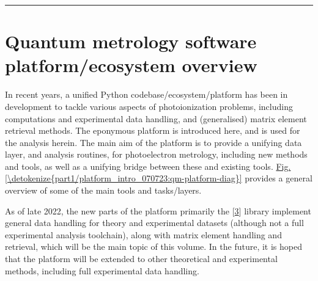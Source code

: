 \documentclass[letterpaper,table,10pt,english]{jupyterBook}
\begin{document}
\bigskip\hrule\bigskip


\sphinxstepscope


\chapter{Quantum metrology software platform/ecosystem overview}
\label{\detokenize{part1/platform_intro_070723:quantum-metrology-software-platform-ecosystem-overview}}\label{\detokenize{part1/platform_intro_070723:chpt-platformintro}}\label{\detokenize{part1/platform_intro_070723::doc}}
\sphinxAtStartPar
In recent years, a unified Python codebase/ecosystem/platform has been in development to tackle various aspects of photoionization problems, including  computations and experimental data handling, and (generalised) matrix element retrieval methods. The eponymous  platform is introduced here, and is used for the analysis herein. The main aim of the platform is to provide a unifying data layer, and analysis routines, for photoelectron metrology, including new methods and tools, as well as a unifying bridge between these and existing tools. \hyperref[\detokenize{part1/platform_intro_070723:qm-platform-diag}]{Fig.\@ \ref{\detokenize{part1/platform_intro_070723:qm-platform-diag}}} provides a general overview of some of the main tools and tasks/layers.

\sphinxAtStartPar
As of late 2022, the new parts of the platform \sphinxhyphen{} primarily the  {[}\hyperlink{cite.backmatter/bibliography:id668}{3}{]} library \sphinxhyphen{} implement general data handling for theory and experimental datasets (although not a full experimental analysis toolchain), along with matrix element handling and retrieval, which will be the main topic of this volume.
In the future, it is hoped that the platform will be extended to other theoretical and experimental methods, including full experimental data handling.
\end{document}
